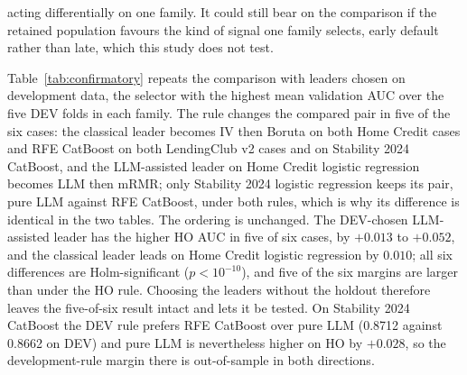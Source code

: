 \documentclass[final,5p,twocolumn]{elsarticle}
\begin{document}
acting differentially on one family. It could still bear on the comparison if the retained population favours the kind of signal one family selects, early default rather than late, which this study does not test.

Table~\ref{tab:confirmatory} repeats the comparison with leaders chosen on development data, the selector with the highest mean validation AUC over the five DEV folds in each family. The rule changes the compared pair in five of the six cases: the classical leader becomes IV then Boruta on both Home Credit cases and RFE CatBoost on both LendingClub v2 cases and on Stability 2024 CatBoost, and the LLM-assisted leader on Home Credit logistic regression becomes LLM then mRMR; only Stability 2024 logistic regression keeps its pair, pure LLM against RFE CatBoost, under both rules, which is why its difference is identical in the two tables. The ordering is unchanged. The DEV-chosen LLM-assisted leader has the higher HO AUC in five of six cases, by $+0.013$ to $+0.052$, and the classical leader leads on Home Credit logistic regression by $0.010$; all six differences are Holm-significant ($p<10^{-10}$), and five of the six margins are larger than under the HO rule. Choosing the leaders without the holdout therefore leaves the five-of-six result intact and lets it be tested. On Stability 2024 CatBoost the DEV rule prefers RFE CatBoost over pure LLM (0.8712 against 0.8662 on DEV) and pure LLM is nevertheless higher on HO by $+0.028$, so the development-rule margin there is out-of-sample in both directions.
\end{document}
